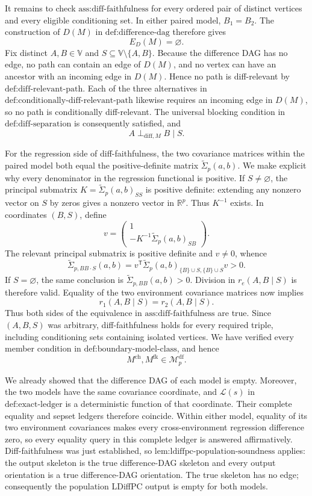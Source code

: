 It remains to check \(\text{ass:diff-faithfulness}\) for every ordered pair of distinct vertices and every eligible conditioning set.  In either paired model, \(B_1=B_2\).  The construction of \(D(M)\) in \(\text{def:difference-dag}\) therefore gives
\[
 E_D(M)=\varnothing.
\]
Fix distinct \(A,B\in\mathbb V\) and \(S\subseteq\mathbb V\setminus\{A,B\}\).  Because the difference DAG has no edge, no path can contain an edge of \(D(M)\), and no vertex can have an ancestor with an incoming edge in \(D(M)\).  Hence no path is diff-relevant by \(\text{def:diff-relevant-path}\).  Each of the three alternatives in \(\text{def:conditionally-diff-relevant-path}\) likewise requires an incoming edge in \(D(M)\), so no path is conditionally diff-relevant.  The universal blocking condition in \(\text{def:diff-separation}\) is consequently satisfied, and
\[
 A\perp_{\mathrm{diff},M}B\mid S.
\]

For the regression side of diff-faithfulness, the two covariance matrices within the paired model both equal the positive-definite matrix \(\widetilde\Sigma_p(a,b)\).  We make explicit why every denominator in the regression functional is positive.  If \(S\neq\varnothing\), the principal submatrix \(K=\widetilde\Sigma_p(a,b)_{SS}\) is positive definite: extending any nonzero vector on \(S\) by zeros gives a nonzero vector in \(\mathbb R^p\).  Thus \(K^{-1}\) exists.  In coordinates \((B,S)\), define
\[
 v=\begin{pmatrix}1\\-K^{-1}\widetilde\Sigma_p(a,b)_{SB}\end{pmatrix}.
\]
The relevant principal submatrix is positive definite and \(v\neq0\), whence
\[
 \widetilde\Sigma_{p,BB\mathbin{\cdot}S}(a,b)
 =v^{\mathsf T}
   \widetilde\Sigma_p(a,b)_{\{B\}\cup S,\{B\}\cup S}v
 >0.
\]
If \(S=\varnothing\), the same conclusion is \(\widetilde\Sigma_{p,BB}(a,b)>0\).  Division in \(r_e(A,B\mid S)\) is therefore valid.  Equality of the two environment covariance matrices now implies
\[
 r_1(A,B\mid S)=r_2(A,B\mid S).
\]
Thus both sides of the equivalence in \(\text{ass:diff-faithfulness}\) are true.  Since \((A,B,S)\) was arbitrary, diff-faithfulness holds for every required triple, including conditioning sets containing isolated vertices.  We have verified every member condition in \(\text{def:boundary-model-class}\), and hence
\[
 M^{\mathrm{ch}},M^{\mathrm{fk}}\in\mathcal M_p^{\mathrm{df}}.
\]

We already showed that the difference DAG of each model is empty.  Moreover, the two models have the same covariance coordinate, and \(\mathcal L(s)\) in \(\text{def:exact-ledger}\) is a deterministic function of that coordinate.  Their complete equality and sepset ledgers therefore coincide.  Within either model, equality of its two environment covariances makes every cross-environment regression difference zero, so every equality query in this complete ledger is answered affirmatively.  Diff-faithfulness was just established, so \(\text{lem:ldiffpc-population-soundness}\) applies: the output skeleton is the true difference-DAG skeleton and every output orientation is a true difference-DAG orientation.  The true skeleton has no edge; consequently the population LDiffPC output is empty for both models.


